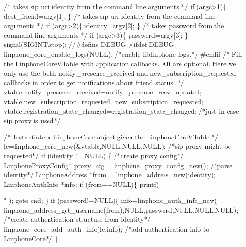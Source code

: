 \begin{DoxyCodeInclude}
{{{        \textcolor{comment}{/* takes   sip uri  identity from the command line arguments */}
        \textcolor{keywordflow}{if} (argc>1)\{
                dest\_friend=argv[1];
        \}
        \textcolor{comment}{/* takes   sip uri  identity from the command line arguments */}
        \textcolor{keywordflow}{if} (argc>2)\{
                identity=argv[2];
        \}
        \textcolor{comment}{/* takes   password from the command line arguments */}
        \textcolor{keywordflow}{if} (argc>3)\{
                password=argv[3];
        \}
        signal(SIGINT,stop);
\textcolor{comment}{//#define DEBUG}
\textcolor{preprocessor}{#ifdef DEBUG}
        linphone_core_enable_logs(NULL); \textcolor{comment}{/*enable liblinphone logs.*/}
\textcolor{preprocessor}{#endif}
        \textcolor{comment}{/*}
\textcolor{comment}{         Fill the LinphoneCoreVTable with application callbacks.}
\textcolor{comment}{         All are optional. Here we only use the both notify\_presence\_received and
       new\_subscription\_requested callbacks}
\textcolor{comment}{         in order to get notifications about friend status.}
\textcolor{comment}{         */}
        vtable.notify_presence_received=notify\_presence\_recv\_updated;
        vtable.new_subscription_requested=new\_subscription\_requested;
        vtable.registration_state_changed=registration\_state\_changed; \textcolor{comment}{/*just in case sip proxy is used*/}

        \textcolor{comment}{/*}
\textcolor{comment}{         Instantiate a LinphoneCore object given the LinphoneCoreVTable}
\textcolor{comment}{        */}
        lc=linphone_core_new(&vtable,NULL,NULL,NULL);
        \textcolor{comment}{/*sip proxy might be requested*/}
        \textcolor{keywordflow}{if} (identity != NULL)  \{
                \textcolor{comment}{/*create proxy config*/}
                LinphoneProxyConfig* proxy\_cfg = linphone_proxy_config_new();
                \textcolor{comment}{/*parse identity*/}
                LinphoneAddress *from = linphone_address_new(identity);
                LinphoneAuthInfo *info;
                \textcolor{keywordflow}{if} (from==NULL)\{
                        printf(\textcolor{stringliteral}{"%
      );
                        \textcolor{keywordflow}{goto} end;
                \}
                \textcolor{keywordflow}{if} (password!=NULL)\{
                        info=linphone_auth_info_new(
      linphone_address_get_username(from),NULL,password,NULL,NULL,NULL); \textcolor{comment}{/*create authentication structure from
       identity*/}
                        linphone_core_add_auth_info(lc,info); \textcolor{comment}{/*add authentication info to LinphoneCore*/}
                \}

}}}}
\end{DoxyCodeInclude}
